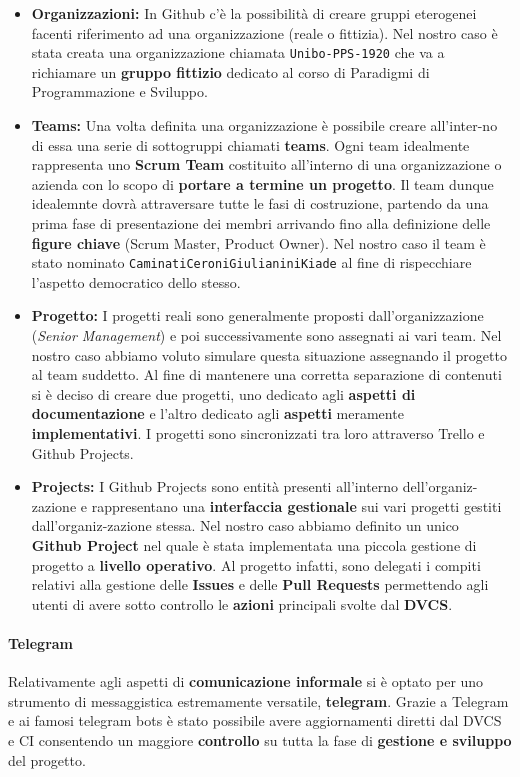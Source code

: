 \begin{itemize}
	\item{\textbf{Organizzazioni:}}
	In Github c'è la possibilità di creare gruppi eterogenei facenti riferimento ad una organizzazione (reale o fittizia). Nel nostro caso è stata creata una organizzazione chiamata \texttt{Unibo-PPS-1920} che va a richiamare un \textbf{gruppo fittizio} dedicato al corso di Paradigmi di Programmazione e Sviluppo.
	\item{\textbf{Teams:}}
	Una volta definita una organizzazione è possibile creare all'inter-no di essa una serie di sottogruppi chiamati \textbf{teams}. Ogni team idealmente rappresenta uno \textbf{Scrum Team} costituito all'interno di una organizzazione o azienda con lo scopo di \textbf{portare a termine un progetto}. Il team dunque idealemnte dovrà attraversare tutte le fasi di costruzione, partendo da una prima fase di presentazione dei membri arrivando fino alla definizione delle \textbf{figure chiave} (Scrum Master, Product Owner). Nel nostro caso il team è stato nominato \texttt{CaminatiCeroniGiulianiniKiade} al fine di rispecchiare l'aspetto democratico dello stesso.
	\item{\textbf{Progetto:}}
	I progetti reali sono generalmente proposti dall'organizzazione (\textit{Senior Management}) e poi successivamente sono assegnati ai vari team. Nel nostro caso abbiamo voluto simulare questa situazione assegnando il progetto al team suddetto. Al fine di mantenere una corretta separazione di contenuti si è deciso di creare due progetti, uno dedicato agli \textbf{aspetti di documentazione} e l'altro dedicato agli \textbf{aspetti} meramente \textbf{implementativi}. I progetti sono sincronizzati tra loro attraverso  Trello e Github Projects.
	\item{\textbf{Projects:}}
	I Github Projects sono entità presenti all'interno dell'organiz-zazione e rappresentano una \textbf{interfaccia gestionale} sui vari progetti gestiti dall'organiz-zazione stessa. Nel nostro caso abbiamo definito un unico \textbf{Github Project} nel quale è stata implementata una piccola gestione di progetto a \textbf{livello operativo}. Al progetto infatti, sono delegati i compiti relativi alla gestione delle \textbf{Issues} e delle \textbf{Pull Requests} permettendo agli utenti di avere sotto controllo le \textbf{azioni} principali svolte dal \textbf{DVCS}.
\end{itemize}

\paragraph{Telegram}
Relativamente agli aspetti di \textbf{comunicazione informale} si è optato per uno strumento di messaggistica estremamente versatile, \textbf{telegram}. Grazie a Telegram e ai famosi telegram bots è stato possibile avere aggiornamenti diretti dal DVCS e CI consentendo un maggiore \textbf{controllo} su tutta la fase di \textbf{gestione e sviluppo} del progetto.

